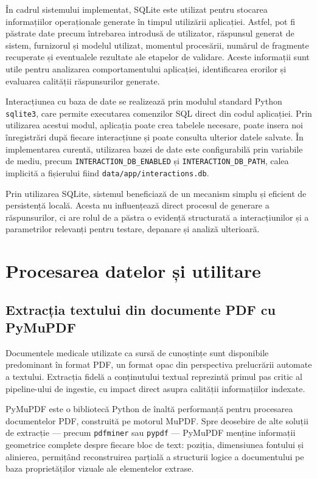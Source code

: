 \documentclass[12pt, a4paper, oneside, romanian]{teza-upb}
\begin{document}
În cadrul sistemului implementat, SQLite este utilizat pentru stocarea informațiilor operaționale generate în timpul utilizării aplicației. Astfel, pot fi păstrate date precum întrebarea introdusă de utilizator, răspunsul generat de sistem, furnizorul și modelul utilizat, momentul procesării, numărul de fragmente recuperate și eventualele rezultate ale etapelor de validare. Aceste informații sunt utile pentru analizarea comportamentului aplicației, identificarea erorilor și evaluarea calității răspunsurilor generate.

Interacțiunea cu baza de date se realizează prin modulul standard Python \texttt{sqlite3}, care permite executarea comenzilor SQL direct din codul aplicației. Prin utilizarea acestui modul, aplicația poate crea tabelele necesare, poate insera noi înregistrări după fiecare interacțiune și poate consulta ulterior datele salvate. În implementarea curentă, utilizarea bazei de date este configurabilă prin variabile de mediu, precum \texttt{INTERACTION\_DB\_ENABLED} și \texttt{INTERACTION\_DB\_PATH}, calea implicită a fișierului fiind \texttt{data/app/interactions.db}.

Prin utilizarea SQLite, sistemul beneficiază de un mecanism simplu și eficient de persistență locală. Acesta nu influențează direct procesul de generare a răspunsurilor, ci are rolul de a păstra o evidență structurată a interacțiunilor și a parametrilor relevanți pentru testare, depanare și analiză ulterioară.

\section{Procesarea datelor și utilitare}

\subsection{Extracția textului din documente PDF cu PyMuPDF}

Documentele medicale utilizate ca sursă de cunoștințe sunt disponibile predominant în format PDF, un format opac din perspectiva prelucrării automate a textului. Extracția fidelă a conținutului textual reprezintă primul pas critic al pipeline-ului de ingestie, cu impact direct asupra calității informațiilor indexate.

PyMuPDF este o bibliotecă Python de înaltă performanță pentru procesarea documentelor PDF, construită pe motorul MuPDF. Spre deosebire de alte soluții de extracție — precum \texttt{pdfminer} sau \texttt{pypdf} — PyMuPDF menține informații geometrice complete despre fiecare bloc de text: poziția, dimensiunea fontului și alinierea, permițând reconstruirea parțială a structurii logice a documentului pe baza proprietăților vizuale ale elementelor extrase.\cite{pymupdf_doc}
\end{document}
